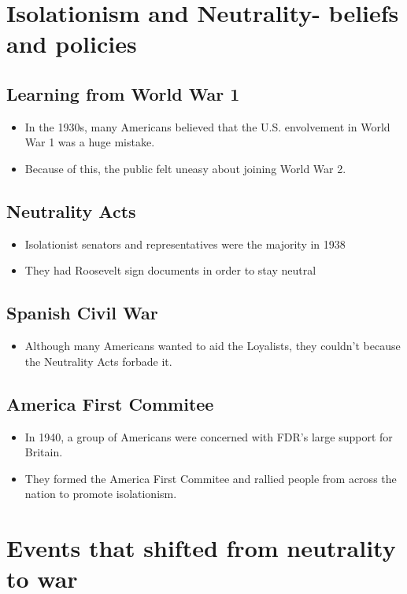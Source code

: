 \documentclass[12pt]{article} %
\begin{document}
	\section{Isolationism and Neutrality- beliefs and policies}

	\subsection{Learning from World War 1}
	\begin{itemize}
		\item In the 1930s, many Americans believed that the U.S. envolvement in World War 1 was a huge mistake.
		\item Because of this, the public felt uneasy about joining World War 2.
	\end{itemize}

	\subsection{Neutrality Acts}
	\begin{itemize}
		\item Isolationist senators and representatives were the majority in 1938 
		\item They had Roosevelt sign documents in order to stay neutral
	\end{itemize}

	\subsection{Spanish Civil War}
	\begin{itemize}
		\item Although many Americans wanted to aid the Loyalists, they couldn't 
			because the Neutrality Acts forbade it.
	\end{itemize}

	\subsection{America First Commitee}
	\begin{itemize}
		\item In 1940, a group of Americans were concerned with FDR's large support for Britain.
		\item They formed the America First Commitee and rallied people from across the nation
			to promote isolationism.
	\end{itemize}

	\section{Events that shifted from neutrality to war}
\end{document}
